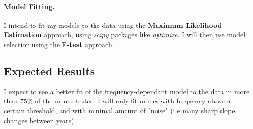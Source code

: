 \documentclass[11pt]{article}
\begin{document}
\paragraph{Model Fitting. } I intend to fit my models to the data using the \textbf{Maximum Likelihood Estimation} approach, using \textit{scipy} packages like \textit{optimize}.
I will then use model selection using the \textbf{F-test} approach.

\subsection*{Expected Results}
I expect to see a better fit of the frequency-dependant model to the data in more than 75\% of the names tested.
I will only fit names with frequency above a certain threshold, and with minimal amount of "noise" (i.e many sharp slope changes between years).
\end{document}
